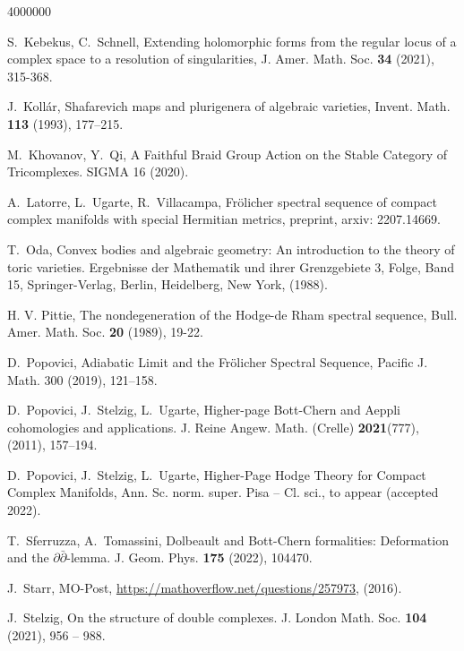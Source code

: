 \documentclass[12pt,reqno]{amsart}
\theoremstyle{definition}
\begin{document}
\begin{thebibliography}{4000000}

 S.~Kebekus, C.~Schnell, Extending holomorphic forms from the regular locus of a complex space to a resolution of singularities, J. Amer. Math. Soc. \textbf{34} (2021), 315-368.

 J.~Koll\'ar, Shafarevich maps and plurigenera of algebraic varieties, Invent. Math. {\bf 113} (1993), 177–215.

 M.~Khovanov, Y.~Qi, A Faithful Braid Group Action on the Stable Category of Tricomplexes. SIGMA 16 (2020).

 A.~Latorre, L.~Ugarte, R.~Villacampa, Frölicher spectral sequence of compact complex manifolds with special Hermitian metrics, preprint, arxiv: 2207.14669.


 T.~Oda, Convex bodies and algebraic geometry: An introduction to the theory of toric varieties. Ergebnisse der Mathematik und ihrer Grenzgebiete 3, Folge, Band 15, Springer-Verlag, Berlin, Heidelberg, New York, (1988).

H. V. Pittie, The nondegeneration of the Hodge-de Rham spectral sequence, Bull. Amer. Math. Soc. {\bf 20} (1989), 19-22.

D.~Popovici, Adiabatic Limit and the Fr\"olicher Spectral Sequence, Pacific J. Math. 300 (2019), 121--158.

D.~Popovici, J.~Stelzig, L.~Ugarte, Higher-page Bott-Chern and Aeppli cohomologies and applications. J. Reine Angew. Math. (Crelle) {\bf 2021}(777), (2011), 157--194.

D.~Popovici, J.~Stelzig, L.~Ugarte, Higher-Page Hodge Theory for Compact Complex Manifolds, Ann. Sc. norm. super. Pisa -- Cl. sci., to appear (accepted 2022).

T.~Sferruzza, A.~Tomassini, Dolbeault and Bott-Chern formalities: Deformation and the $\partial\bar\partial$-lemma. J. Geom. Phys. {\bf 175} (2022), 104470.

 J.~Starr, MO-Post, \url{https://mathoverflow.net/questions/257973}, (2016).

 J.~Stelzig, On the structure of double complexes. J. London Math. Soc. {\bf 104} (2021), 956 -- 988.


\end{thebibliography}
\end{document}
